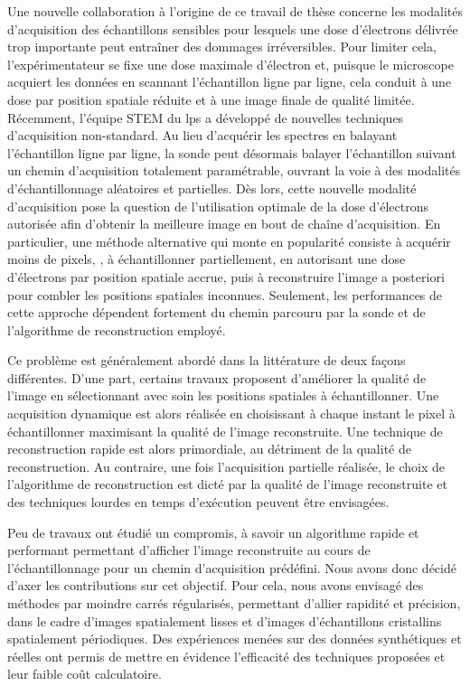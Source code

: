 Une nouvelle collaboration à l'origine de ce travail de thèse concerne les modalités d'acquisition des échantillons sensibles pour lesquels une dose d'électrons délivrée trop importante peut entraîner des dommages irréversibles. Pour limiter cela, l'expérimentateur se fixe une dose maximale d'électron et, puisque le microscope acquiert les données en scannant l'échantillon ligne par ligne, cela conduit à une dose par position spatiale réduite et à une image finale de qualité limitée.
%
Récemment, l'équipe STEM du \gls{lps} a développé de nouvelles techniques d'acquisition non-standard. Au lieu d'acquérir les spectres en balayant l'échantillon ligne par ligne, la sonde peut désormais balayer l'échantillon suivant un chemin d'acquisition totalement paramétrable, ouvrant la voie à des modalités d'échantillonnage aléatoires et partielles. 
%
Dès lors, cette nouvelle modalité d'acquisition pose la question de l'utilisation optimale de la dose d'électrons autorisée afin d'obtenir la meilleure image en bout de chaîne d'acquisition. 
%
En particulier, une méthode alternative qui monte en popularité consiste à acquérir moins de pixels, \ie{}, à échantillonner partiellement, en autorisant une dose d'électrons par position spatiale accrue, puis à reconstruire l'image a posteriori pour combler les positions spatiales inconnues. Seulement, les performances de cette approche dépendent fortement du chemin parcouru par la sonde et de l'algorithme de reconstruction employé.

Ce problème est généralement abordé dans la littérature de deux façons différentes. D'une part, certains travaux proposent d'améliorer la qualité de l'image en sélectionnant avec soin les positions spatiales à échantillonner. Une acquisition dynamique est alors réalisée en choisissant à chaque instant le pixel à échantillonner maximisant la qualité de l'image reconstruite. Une technique de reconstruction rapide est alors primordiale, au détriment de la qualité de reconstruction. Au contraire, une fois l'acquisition partielle réalisée, le choix de l'algorithme de reconstruction est dicté par la qualité de l'image reconstruite et des techniques lourdes en temps d'exécution peuvent être envisagées. 

Peu de travaux ont étudié un compromis, à savoir un algorithme rapide et performant permettant d'afficher l'image reconstruite au cours de l'échantillonnage pour un chemin d'acquisition prédéfini.  Nous avons donc décidé d'axer les contributions sur cet objectif. Pour cela, nous avons envisagé des méthodes par moindre carrés régularisés, permettant d'allier rapidité et précision, dans le cadre d'images spatialement lisses et d'images d'échantillons cristallins spatialement périodiques. Des expériences menées sur des données synthétiques et réelles ont permis de mettre en évidence l'efficacité des techniques proposées et leur faible coût calculatoire. 

